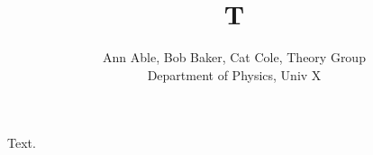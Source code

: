 \documentclass{article}
\begin{document}
\title{T}
\author{Ann Able, Bob Baker, Cat Cole, Theory Group\\ Department of Physics, Univ X}
\maketitle
Text.
\end{document}
